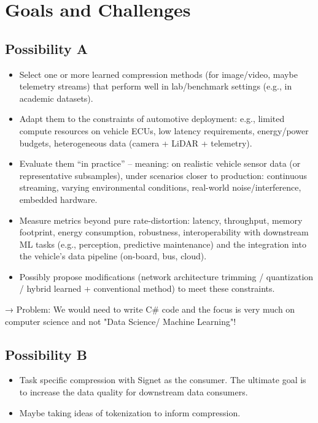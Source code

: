 \section{Goals and Challenges}

\subsection{Possibility A}
\begin{itemize}
    \item Select one or more learned compression methods (for image/video, maybe telemetry streams) that perform well in lab/benchmark settings (e.g., in academic datasets).
    \item Adapt them to the constraints of automotive deployment: e.g., limited compute resources on vehicle ECUs, low latency requirements, energy/power budgets, heterogeneous data (camera + LiDAR + telemetry).
    \item Evaluate them “in practice” – meaning: on realistic vehicle sensor data (or representative subsamples), under scenarios closer to production: continuous streaming, varying environmental conditions, real-world noise/interference, embedded hardware.
    \item Measure metrics beyond pure rate-distortion: latency, throughput, memory footprint, energy consumption, robustness, interoperability with downstream ML tasks (e.g., perception, predictive maintenance) and the integration into the vehicle’s data pipeline (on-board, bus, cloud).
    \item Possibly propose modifications (network architecture trimming / quantization / hybrid learned + conventional method) to meet these constraints.
\end{itemize}
→ Problem: We would need to write C\# code and the focus is very much on computer science and not "Data Science/ Machine Learning"!

\subsection{Possibility B}
\begin{itemize}
    \item Task specific compression with Signet as the consumer. The ultimate goal is to increase the data quality for downstream data consumers.
    \item Maybe taking ideas of tokenization to inform compression.
\end{itemize}
